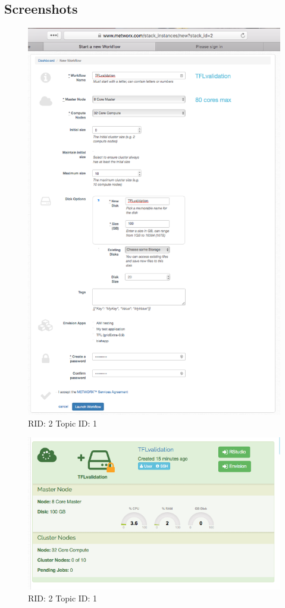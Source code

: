 \documentclass{article}
\begin{document}
\subsection*{Screenshots}

\begin{figure}[!htbp]
\includegraphics[width=.8\textwidth]{screencaps/2-1-1.png}
\caption{RID: 2 Topic ID: 1}
\end{figure}

\begin{figure}[!htbp]
\includegraphics[width=.8\textwidth]{screencaps/2-1-2.png}
\caption{RID: 2 Topic ID: 1}
\end{figure}
\end{document}
